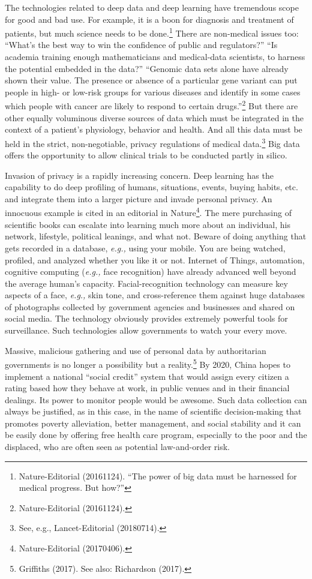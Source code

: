 \begin{multicols}{2}
The technologies related to deep data and deep learning have tremendous scope for good and bad use. For example, it is a boon for diagnosis and treatment of patients, but much science needs to be done.\footnote{Nature-Editorial (20161124). “The power of big data must be harnessed for medical progress. But how?”}  There are non-medical issues too: “What's the best way to win the confidence of public and regulators?” “Is academia training enough mathematicians and medical-data scientists, to harness the potential embedded in the data?” “Genomic data sets alone have already shown their value. The presence or absence of a particular gene variant can put people in high- or low-risk groups for various diseases and identify in some cases which people with cancer are likely to respond to certain drugs.”\footnote{Nature-Editorial (20161124).}  But there are other equally voluminous diverse sources of data which must be integrated in the context of a patient's physiology, behavior and health. And all this data must be held in the strict, non-negotiable, privacy regulations of medical data.\footnote{See, e.g., Lancet-Editorial (20180714).}  Big data offers the opportunity to allow clinical trials to be conducted partly in silico.

Invasion of privacy is a rapidly increasing concern. Deep learning has the capability to do deep profiling of humans, situations, events, buying habits, etc. and integrate them into a larger picture and invade personal privacy. An innocuous example is cited in an editorial in Nature\footnote{Nature-Editorial (20170406).}. The mere purchasing of scientific books can escalate into learning much more about an individual, his network, lifestyle, political leanings, and what not. Beware of doing anything that gets recorded in a database, \textit{e.g.,} using your mobile. You are being watched, profiled, and analyzed whether you like it or not. Internet of Things, automation, cognitive computing (\textit{e.g.,} face recognition) have already advanced well beyond the average human's capacity. Facial-recognition technology can measure key aspects of a face, \textit{e.g.,} skin tone, and cross-reference them against huge databases of photographs collected by government agencies and businesses and shared on social media. The technology obviously provides extremely powerful tools for surveillance. Such technologies allow governments to watch your every move.

Massive, malicious gathering and use of personal data by authoritarian governments is no longer a possibility but a reality.\footnote{Griffiths (2017). See also: Richardson (2017).}  By 2020, China hopes to implement a national “social credit” system that would assign every citizen a rating based how they behave at work, in public venues and in their financial dealings. Its power to monitor people would be awesome. Such data collection can always be justified, as in this case, in the name of scientific decision-making that promotes poverty alleviation, better management, and social stability and it can be easily done by offering free health care program, especially to the poor and the displaced, who are often seen as potential law-and-order risk. 


\end{multicols}
